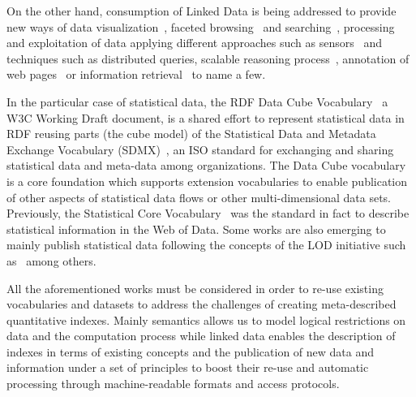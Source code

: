 On the other hand, consumption of Linked Data is being addressed to provide new ways of data visualization~\cite{DBLP:journals/semweb/DadzieR11}, 
faceted browsing~\cite{Pietriga06fresnel} and searching~\cite{hoga-etal-2011-swse-JWS}, processing~\cite{Harth:2011:SIP:1963192.1963318} and exploitation of data applying 
different approaches such as sensors~\cite{Jeung:2010:EMM:1850003.1850235,ontology-search} and techniques  such as distributed 
queries\cite{Hartig09executingsparql}, scalable reasoning process~\cite{DBLP:conf/semweb/UrbaniKOH09,DBLP:conf/semweb/HoganPPD10}, 
annotation of web pages~\cite{rdfa-primer} or information retrieval~\cite{Pound} to name a few.

In the particular case of statistical data, the RDF Data Cube Vocabulary~\cite{rdf-data-cube}
a W3C Working Draft document, is a shared effort to represent statistical data in RDF reusing parts (the cube model) 
of the Statistical Data and Metadata Exchange Vocabulary (SDMX)~\cite{sdmx}, an ISO standard 
for exchanging and sharing statistical data and meta-data among organizations. The Data Cube vocabulary is a core 
foundation which supports extension vocabularies to enable publication of other aspects of statistical data flows or 
other multi-dimensional data sets. Previously, the Statistical Core Vocabulary~\cite{scovo} was the standard in fact to describe statistical information in the Web of Data.
Some works are also emerging to mainly publish statistical data following the concepts of the LOD initiative 
such as~\cite{DBLP:conf/semweb/ZapilkoM11,DBLP:journals/ijsc/SalasMBCMA12,DDI2013,DBLP:conf/dgo/FernandezMG11,webindexlod} 
among others.

All the aforementioned works must be considered in order to re-use existing vocabularies and datasets to address 
the challenges of creating meta-described quantitative indexes. Mainly semantics allows us to model logical restrictions 
on data and the computation process while linked data enables the description of indexes in terms of existing concepts and 
the publication of new data and information under a set of principles to boost their re-use and automatic 
processing through machine-readable formats and access protocols.

